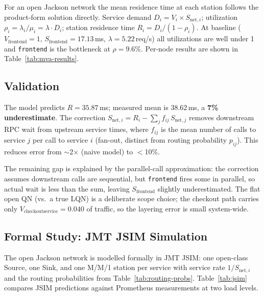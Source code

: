 \documentclass[12pt]{article}
\begin{document}
For an open Jackson network the mean residence time at each station follows the product-form solution directly. Service demand $D_i = V_i \times S_{\text{net},i}$; utilization $\rho_i = \lambda_i / \mu_i = \lambda \cdot D_i$; station residence time $R_i = D_i/(1-\rho_i)$. At baseline ($V_{\text{frontend}}=1$, $S_{\text{frontend}}=17.13$\,ms, $\lambda=5.22$\,req/s) all utilizations are well under 1 and \texttt{frontend} is the bottleneck at $\rho=9.6\%$. Per-node results are shown in Table~\ref{tab:mva-results}.

\subsection{Validation}

The model predicts $R=35.87$\,ms; measured mean is $38.62$\,ms, a \textbf{7\% underestimate}. The correction $S_{\text{net},i} = R_i - \sum_j f_{ij}\,S_{\text{net},j}$ removes downstream RPC wait from upstream service times, where $f_{ij}$ is the mean number of calls to service $j$ per call to service $i$ (fan-out, distinct from routing probability $p_{ij}$). This reduces error from $\sim$2$\times$ (naive model) to $<$10\%.

The remaining gap is explained by the parallel-call approximation: the correction assumes downstream calls are sequential, but \texttt{frontend} fires some in parallel, so actual wait is less than the sum, leaving $S_{\text{frontend}}$ slightly underestimated. The flat open QN (vs.\ a true LQN) is a deliberate scope choice; the checkout path carries only $V_{\text{checkoutservice}}=0.040$ of traffic, so the layering error is small system-wide.

\subsection{Formal Study: JMT JSIM Simulation}

The open Jackson network is modelled formally in JMT JSIM: one open-class Source, one Sink, and one M/M/1 station per service with service rate $1/S_{\text{net},i}$ and the routing probabilities from Table~\ref{tab:routing-probs}. Table~\ref{tab:jsim} compares JSIM predictions against Prometheus measurements at two load levels.
\end{document}

